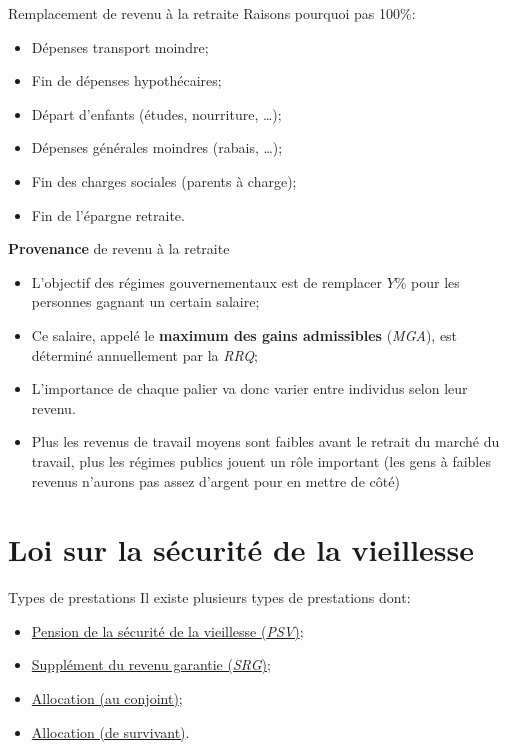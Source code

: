 \documentclass[10pt, french]{article}
\begin{document}
\begin{multicols*}{3}
\begin{conceptgen}{Remplacement de revenu à la retraite}
Raisons pourquoi pas 100\%:
\begin{itemize}[leftmargin = *]
	\item	Dépenses transport moindre;
	\item	Fin de dépenses hypothécaires;
	\item	Départ d'enfants (études, nourriture, \dots);
	\item	Dépenses générales moindres (rabais, \dots);
	\item	Fin des charges sociales (parents à charge);
	\item	Fin de l'épargne retraite.
\end{itemize}
\tcbline
\textbf{Provenance} de revenu à la retraite
\begin{itemize}[leftmargin = *]
	\item	L'objectif des régimes gouvernementaux est de remplacer $Y\%$ pour les personnes gagnant un certain salaire;
	\item	Ce salaire, appelé le \textbf{maximum des gains admissibles} (\textit{MGA}), est déterminé annuellement par la \textit{RRQ};
	\item	L'importance de chaque palier va donc varier entre individus selon leur revenu.
	\item[] Plus les revenus de travail moyens sont faibles avant le retrait du marché du travail, plus les régimes publics jouent un rôle important (les gens à faibles revenus n'aurons pas assez d'argent pour en mettre de côté) 
\end{itemize}
\end{conceptgen}

\newpage

\section{Loi sur la sécurité de la vieillesse}

\begin{conceptgen}{Types de prestations}
Il existe plusieurs types de prestations dont:
\begin{itemize}[leftmargin =  *]
	\item	\hyperref[sec:PSV]{Pension de la sécurité de la vieillesse (\textit{PSV})};
	\item	\hyperref[sec:SRG]{Supplément du revenu garantie (\textit{SRG})};
	\item	\hyperref[sec:Alloc]{Allocation (au conjoint)};
	\item	\hyperref[sec:Alloc_survival]{Allocation (de survivant)}.
\end{itemize}
\end{conceptgen}


\end{multicols*}
\end{document}
